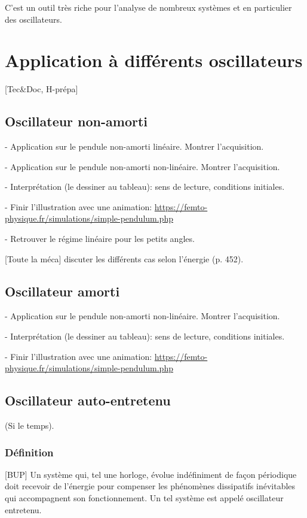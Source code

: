 \documentclass[11pt]{report}
\numberwithin{figure}{section}
\numberwithin{equation}{section}
\numberwithin{table}{section}
\newcommand{\1}{\boldsymbol{1}}
\begin{document}
C'est un outil très riche pour l'analyse de nombreux systèmes et en particulier des oscillateurs.

\section{Application à différents oscillateurs}

[Tec\&Doc, H-prépa]

\subsection{Oscillateur non-amorti}

- Application sur le pendule non-amorti linéaire. Montrer l'acquisition.

- Application sur le pendule non-amorti non-linéaire. Montrer l'acquisition.

- Interprétation (le dessiner au tableau): sens de lecture, conditions initiales. 

- Finir l'illustration avec une animation: \url{https://femto-physique.fr/simulations/simple-pendulum.php}

- Retrouver le régime linéaire pour les petits angles.

[Toute la méca] discuter les différents cas selon l'énergie (p. 452).

\subsection{Oscillateur amorti}

- Application sur le pendule non-amorti non-linéaire. Montrer l'acquisition.

- Interprétation (le dessiner au tableau): sens de lecture, conditions initiales. 

- Finir l'illustration avec une animation: \url{https://femto-physique.fr/simulations/simple-pendulum.php}

\subsection{Oscillateur auto-entretenu}

(Si le temps).

\subsubsection{Définition}

[BUP] Un système qui, tel une horloge, évolue indéfiniment de façon périodique doit recevoir de l'énergie pour compenser les phénomènes dissipatifs inévitables qui accompagnent son fonctionnement. Un tel
système est appelé oscillateur entretenu.
\end{document}
